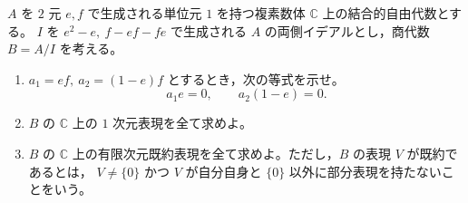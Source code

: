 \newcommand{\C}{\mathbb{C}}
\newcommand{\R}{\mathbb{R}}
\newcommand{\Z}{\mathbb{Z}}
\newcommand{\Tr}{\operatorname{Tr}}
\newcommand{\Impart}{\operatorname{Im}}
\newcommand{\AF}{\operatorname{AF}}
\newcommand{\AX}{\operatorname{AX}}
\newcommand{\GL}{\operatorname{GL}}


\(A\) を \(2\) 元 \(e,f\) で生成される単位元 \(1\) を持つ複素数体 \(\C\) 上の結合的自由代数とする。
\(I\) を \(e^2-e,\ f-ef-fe\) で生成される \(A\) の両側イデアルとし，商代数 \(B=A/I\) を考える。

\begin{enumerate}
  \item \(a_1=ef,\ a_2=(1-e)f\) とするとき，次の等式を示せ。
  \[
    a_1e=0,\qquad a_2(1-e)=0.
  \]
  \item \(B\) の \(\C\) 上の \(1\) 次元表現を全て求めよ。
  \item \(B\) の \(\C\) 上の有限次元既約表現を全て求めよ。ただし，\(B\) の表現 \(V\) が既約であるとは，
  \(V\ne\{0\}\) かつ \(V\) が自分自身と \(\{0\}\) 以外に部分表現を持たないことをいう。
\end{enumerate}

%